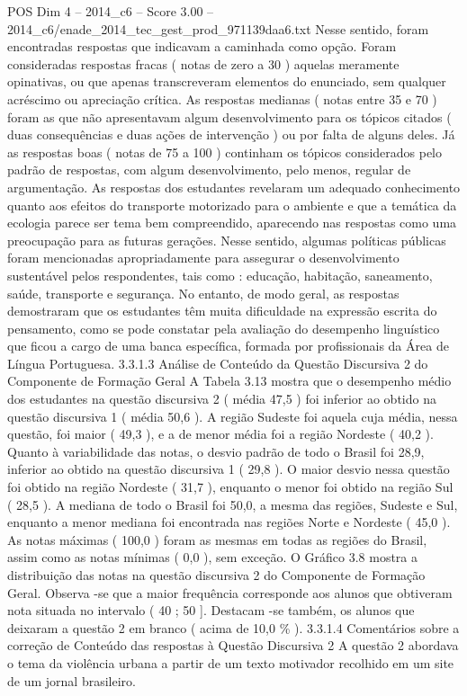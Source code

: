 \begin{textsample}{POS Dim 4 – 2014\_c6 – Score 3.00 – 2014\_c6/enade\_2014\_tec\_gest\_prod\_971139daa6.txt}
Nesse sentido, foram encontradas respostas que indicavam a caminhada como opção.
Foram consideradas respostas fracas ( notas de zero a 30 ) aquelas meramente opinativas, ou que apenas transcreveram elementos do enunciado, sem qualquer acréscimo ou apreciação crítica.
As respostas medianas ( notas entre 35 e 70 ) foram as que não apresentavam algum desenvolvimento para os tópicos citados ( duas consequências e duas ações de intervenção ) ou por falta de alguns deles.
Já as respostas boas ( notas de 75 a 100 ) continham os tópicos considerados pelo padrão de respostas, com algum desenvolvimento, pelo menos, regular de argumentação.
As respostas dos estudantes revelaram um adequado conhecimento quanto aos efeitos do transporte motorizado para o ambiente e que a temática da ecologia parece ser tema bem compreendido, aparecendo nas respostas como uma preocupação para as futuras gerações.
Nesse sentido, algumas políticas públicas foram mencionadas apropriadamente para assegurar o desenvolvimento sustentável pelos respondentes, tais como : educação, habitação, saneamento, saúde, transporte e segurança.
No entanto, de modo geral, as respostas demostraram que os estudantes têm muita dificuldade na expressão escrita do pensamento, como se pode constatar pela avaliação do desempenho linguístico que ficou a cargo de uma banca específica, formada por profissionais da Área de Língua Portuguesa. 3.3.1.3 Análise de Conteúdo da Questão Discursiva 2 do Componente de Formação Geral A Tabela 3.13 mostra que o desempenho médio dos estudantes na questão discursiva 2 ( média 47,5 ) foi inferior ao obtido na questão discursiva 1 ( média 50,6 ).
A região Sudeste foi aquela cuja média, nessa questão, foi maior ( 49,3 ), e a de menor média foi a região Nordeste ( 40,2 ).
Quanto à variabilidade das notas, o desvio padrão de todo o Brasil foi 28,9, inferior ao obtido na questão discursiva 1 ( 29,8 ).
O maior desvio nessa questão foi obtido na região Nordeste ( 31,7 ), enquanto o menor foi obtido na região Sul ( 28,5 ).
A mediana de todo o Brasil foi 50,0, a mesma das regiões, Sudeste e Sul, enquanto a menor mediana foi encontrada nas regiões Norte e Nordeste ( 45,0 ).
As notas máximas ( 100,0 ) foram as mesmas em todas as regiões do Brasil, assim como as notas mínimas ( 0,0 ), sem exceção.
O Gráfico 3.8 mostra a distribuição das notas na questão discursiva 2 do Componente de Formação Geral.
Observa -se que a maior frequência corresponde aos alunos que obtiveram nota situada no intervalo ( 40 ; 50 ].
Destacam -se também, os alunos que deixaram a questão 2 em branco ( acima de 10,0 \% ). 3.3.1.4 Comentários sobre a correção de Conteúdo das respostas à Questão Discursiva 2 A questão 2 abordava o tema da violência urbana a partir de um texto motivador recolhido em um site de um jornal brasileiro.

\end{textsample}
